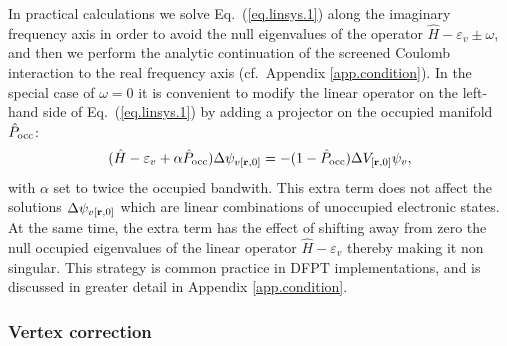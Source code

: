 \documentclass[twocolumn,prb,showpacs,superscriptaddress]{revtex4}
\def\w{\omega}
\def\H{\hat{H}}
\def\P{\hat{P}_{\rm occ}}
\def\E{\varepsilon}
\def\r{{\bf r}}
\begin{document}
In practical calculations we solve Eq.\ (\ref{eq.linsys.1}) along the imaginary
frequency axis in order to avoid the null eigenvalues of the operator
$\H-\E_v\pm\w$, and then we perform the analytic continuation of 
the screened Coulomb interaction to the real frequency axis (cf.\ Appendix \ref{app.condition}).
In the special case of $\w=0$ it is convenient to modify the linear operator on the left-hand side of
Eq.\ (\ref{eq.linsys.1}) by adding a projector on the occupied manifold $\P$:
 \begin{equation} \label{eq.linsys.1b}
 (\H-\E_v+\alpha\P) \Delta \psi_{v[\r,0]}  = -(1-\P)  \Delta V_{[\r,0]} \psi_v,
  \end{equation}
with $\alpha$ set to twice the occupied bandwith. This extra term does not affect
the solutions $\Delta \psi_{v[\r,0]}$ which are linear combinations
of unoccupied electronic states. At the same time, the extra term
has the effect of shifting away from zero the null occupied eigenvalues 
of the linear operator $\H-\E_v$ thereby making it non singular.
This strategy is common practice in DFPT implementations,\cite{baroni.rmp,espresso} and
is discussed in greater detail in Appendix \ref{app.condition}.

\subsubsection{Vertex correction}
\end{document}
